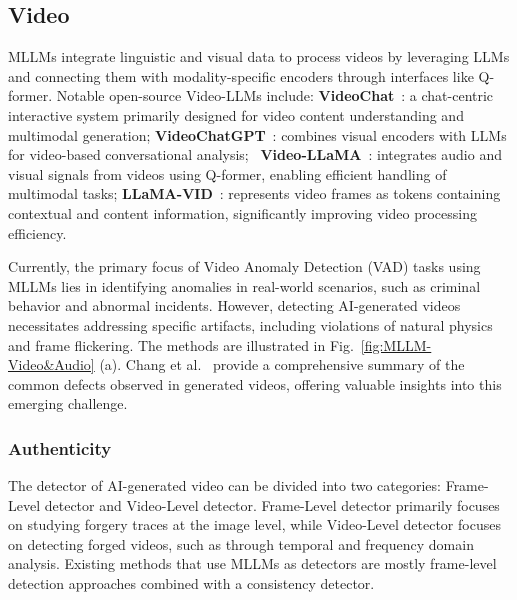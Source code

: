 \subsection{Video}
MLLMs integrate linguistic and visual data to process videos by leveraging LLMs and connecting them with modality-specific encoders through interfaces like Q-former. Notable open-source Video-LLMs include: \textbf{VideoChat}~\cite{li2023videochat}: a chat-centric interactive system primarily designed for video content understanding and multimodal generation; \textbf{VideoChatGPT}~\cite{maaz2023video}: combines visual encoders with LLMs for video-based conversational analysis; ~\textbf{Video-LLaMA}~\cite{zhang2023video}: integrates audio and visual signals from videos using Q-former, enabling efficient handling of multimodal tasks; \textbf{LLaMA-VID}~\cite{li2025llama}: represents video frames as tokens containing contextual and content information, significantly improving video processing efficiency.

Currently, the primary focus of Video Anomaly Detection (VAD) tasks using MLLMs lies in identifying anomalies in real-world scenarios, such as criminal behavior and abnormal incidents. However, detecting AI-generated videos necessitates addressing specific artifacts, including violations of natural physics and frame flickering. The methods are illustrated in Fig.~\ref{fig:MLLM-Video&Audio} (a). Chang et al.~\cite{chang2024matters} provide a comprehensive summary of the common defects observed in generated videos, offering valuable insights into this emerging challenge.

    \subsubsection{\textbf{Authenticity}}
    The detector of AI-generated video can be divided into two categories: Frame-Level detector and Video-Level detector. Frame-Level detector primarily focuses on studying forgery traces at the image level, while Video-Level detector focuses on detecting forged videos, such as through temporal and frequency domain analysis. Existing methods that use MLLMs as detectors are mostly frame-level detection approaches combined with a consistency detector.
    
